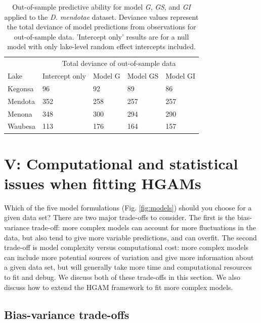 \documentclass[12pt]{article}
\begin{document}
\begin{table}[t]

\caption{\label{tab:zoo_daph_outofsample_kable}Out-of-sample predictive ability for model \textit{G}, \textit{GS}, and \textit{GI} applied to the \textit{D. mendotae} dataset. Deviance values represent the total deviance of model predictions from observations for out-of-sample data. 'Intercept only' results are for a null model with only lake-level random effect intercepts included.}
\centering
\begin{tabular}{lllll}
\toprule
\multicolumn{1}{c}{ } & \multicolumn{4}{c}{Total deviance of out-of-sample data} \\
\cmidrule(l{2pt}r{2pt}){2-5}
Lake & Intercept only & Model G & Model GS & Model GI\\
\midrule
Kegonsa & 96 & 92 & 89 & 86\\
Mendota & 352 & 258 & 257 & 257\\
Menona & 348 & 300 & 294 & 290\\
Waubesa & 113 & 176 & 164 & 157\\
\bottomrule
\end{tabular}
\end{table}

\FloatBarrier

\section{V: Computational and statistical issues when fitting
HGAMs}\label{v-computational-and-statistical-issues-when-fitting-hgams}

Which of the five model formulations (Fig. \ref{fig:models}) should you
choose for a given data set? There are two major trade-offs to consider.
The first is the bias-variance trade-off: more complex models can
account for more fluctuations in the data, but also tend to give more
variable predictions, and can overfit. The second trade-off is model
complexity versus computational cost: more complex models can include
more potential sources of variation and give more information about a
given data set, but will generally take more time and computational
resources to fit and debug. We discuss both of these trade-offs in this
section. We also discuss how to extend the HGAM framework to fit more
complex models.

\subsection{Bias-variance trade-offs}\label{bias-variance-trade-offs}
\end{document}
